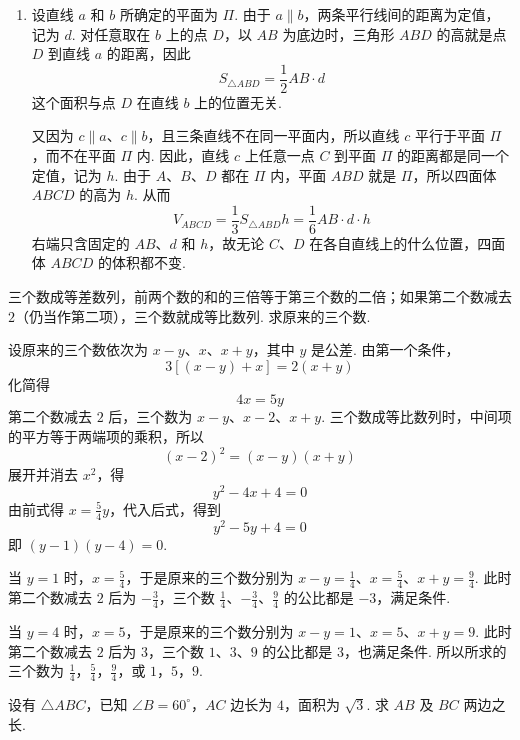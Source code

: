 \begin{solution}
\begin{enumerate}
\item 设直线 \(a\) 和 \(b\) 所确定的平面为 \(\Pi\). 由于 \(a\parallel b\)，两条平行线间的距离为定值，记为 \(d\). 对任意取在 \(b\) 上的点 \(D\)，以 \(AB\) 为底边时，三角形 \(ABD\) 的高就是点 \(D\) 到直线 \(a\) 的距离，因此
\[
S_{\triangle ABD}=\frac12 AB\cdot d
\]
这个面积与点 \(D\) 在直线 \(b\) 上的位置无关.

又因为 \(c\parallel a\)、\(c\parallel b\)，且三条直线不在同一平面内，所以直线 \(c\) 平行于平面 \(\Pi\)，而不在平面 \(\Pi\) 内. 因此，直线 \(c\) 上任意一点 \(C\) 到平面 \(\Pi\) 的距离都是同一个定值，记为 \(h\). 由于 \(A\)、\(B\)、\(D\) 都在 \(\Pi\) 内，平面 \(ABD\) 就是 \(\Pi\)，所以四面体 \(ABCD\) 的高为 \(h\). 从而
\[
V_{ABCD}=\frac13S_{\triangle ABD}h=\frac16AB\cdot d\cdot h
\]
右端只含固定的 \(AB\)、\(d\) 和 \(h\)，故无论 \(C\)、\(D\) 在各自直线上的什么位置，四面体 \(ABCD\) 的体积都不变.
\end{enumerate}
\end{solution}

\begin{problem}
三个数成等差数列，前两个数的和的三倍等于第三个数的二倍；如果第二个数减去 \(2\)（仍当作第二项），三个数就成等比数列. 求原来的三个数.
\end{problem}

\begin{solution}
设原来的三个数依次为 \(x-y\)、\(x\)、\(x+y\)，其中 \(y\) 是公差. 由第一个条件，
\[
3\left[\left(x-y\right)+x\right]=2\left(x+y\right)
\]
化简得
\[
4x=5y
\]
第二个数减去 \(2\) 后，三个数为 \(x-y\)、\(x-2\)、\(x+y\). 三个数成等比数列时，中间项的平方等于两端项的乘积，所以
\[
\left(x-2\right)^2=\left(x-y\right)\left(x+y\right)
\]
展开并消去 \(x^2\)，得
\[
y^2-4x+4=0
\]
由前式得 \(x=\frac54y\)，代入后式，得到
\[
y^2-5y+4=0
\]
即 \(\left(y-1\right)\left(y-4\right)=0\).

当 \(y=1\) 时，\(x=\frac54\)，于是原来的三个数分别为 \(x-y=\frac14\)、\(x=\frac54\)、\(x+y=\frac94\).
此时第二个数减去 \(2\) 后为 \(-\frac34\)，三个数 \(\frac14\)、\(-\frac34\)、\(\frac94\) 的公比都是 \(-3\)，满足条件.

当 \(y=4\) 时，\(x=5\)，于是原来的三个数分别为 \(x-y=1\)、\(x=5\)、\(x+y=9\).
此时第二个数减去 \(2\) 后为 \(3\)，三个数 \(1\)、\(3\)、\(9\) 的公比都是 \(3\)，也满足条件. 所以所求的三个数为 \(\frac14\)，\(\frac54\)，\(\frac94\)，或 \(1\)，\(5\)，\(9\).
\end{solution}

\begin{problem}
设有 \(\triangle ABC\)，已知 \(\angle B=60^\circ\)，\(AC\) 边长为 \(4\)，面积为 \(\sqrt3\). 求 \(AB\) 及 \(BC\) 两边之长.
\end{problem}

